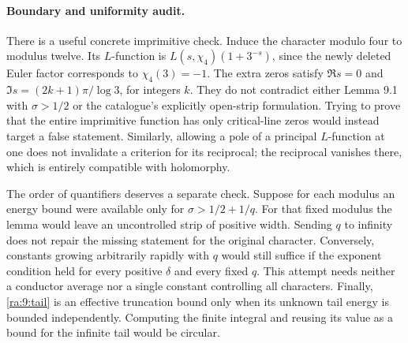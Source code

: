 \documentclass[11pt]{article}
\begin{document}
\paragraph{Boundary and uniformity audit.}
There is a useful concrete imprimitive check. Induce the character modulo
four to modulus twelve. Its $L$-function is
$L(s,\chi_4)(1+3^{-s})$, since the newly deleted Euler factor corresponds
to $\chi_4(3)=-1$. The extra zeros satisfy
$\Re s=0$ and $\Im s=(2k+1)\pi/\log3$, for integers $k$.
They do not contradict either Lemma 9.1 with $\sigma>1/2$ or the
catalogue's explicitly open-strip formulation. Trying to prove that the
entire imprimitive function has only critical-line zeros would instead
target a false statement. Similarly, allowing a pole of a principal
$L$-function at one does not invalidate a criterion for its reciprocal;
the reciprocal vanishes there, which is entirely compatible with
holomorphy.

The order of quantifiers deserves a separate check. Suppose for each
modulus an energy bound were available only for
$\sigma>1/2+1/q$. For that fixed modulus the lemma would leave an
uncontrolled strip of positive width. Sending $q$ to infinity does not
repair the missing statement for the original character. Conversely,
constants growing arbitrarily rapidly with $q$ would still suffice if
the exponent condition held for every positive $\delta$ and every fixed
$q$. This attempt needs neither a conductor average nor a single
constant controlling all characters. Finally, \eqref{ra:9:tail} is an
effective truncation bound only when its unknown tail energy is bounded
independently. Computing the finite integral and reusing its value as
a bound for the infinite tail would be circular.
\end{document}
